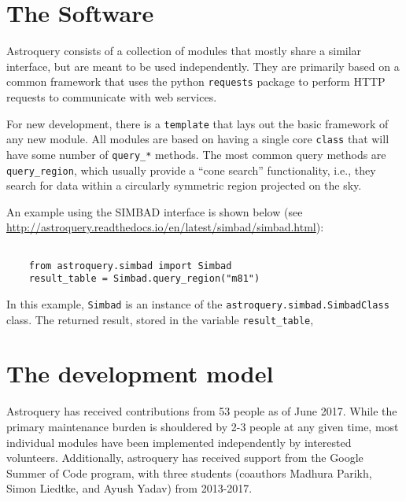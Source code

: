 \section{The Software}
Astroquery consists of a collection of modules that mostly share a similar interface,
but are meant to be used independently.  They are primarily based on a common framework
that uses the python \texttt{requests} package to perform HTTP requests to communicate
with web services.

For new development, there is a \texttt{template}  that lays out the basic
framework of any new module.  All modules are based on having a single core
\texttt{class} that will have some number of \texttt{query\_*} methods.
The most common query methods are \texttt{query\_region}, which usually provide
a ``cone search'' functionality, i.e., they search for data within a circularly
symmetric region projected on the sky.

An example using the SIMBAD interface is shown below (see
\url{http://astroquery.readthedocs.io/en/latest/simbad/simbad.html}):
\begin{lstlisting}

    from astroquery.simbad import Simbad
    result_table = Simbad.query_region("m81")

\end{lstlisting}
In this example, \texttt{Simbad} is an instance of the
\texttt{astroquery.simbad.SimbadClass} class.
The returned result, stored in the variable \texttt{result\_table},

\section{The development model}
Astroquery has received contributions from 53 people as of June 2017.
While the primary maintenance burden is shouldered by 2-3 people at any given time,
most individual modules have been implemented independently by interested volunteers.
Additionally, astroquery has received support from the Google Summer of Code
program, with three students (coauthors Madhura Parikh, Simon Liedtke, and Ayush Yadav)
from 2013-2017.


